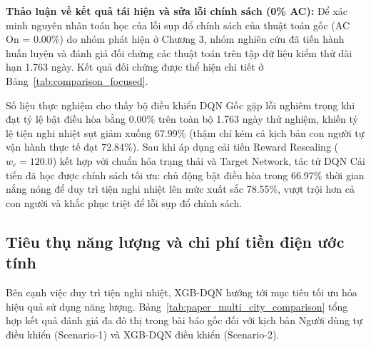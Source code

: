 \documentclass[12pt, a4paper]{report}
\begin{document}
\noindent
\textbf{Thảo luận về kết quả tái hiện và sửa lỗi chính sách (0\% AC):}
Để xác minh nguyên nhân toán học của lỗi sụp đổ chính sách của thuật toán gốc (AC On = 0.00\%) do nhóm phát hiện ở Chương 3, nhóm nghiên cứu đã tiến hành huấn luyện và đánh giá đối chứng các thuật toán trên tập dữ liệu kiểm thử dài hạn 1.763 ngày. Kết quả đối chứng được thể hiện chi tiết ở Bảng~\ref{tab:comparison_focused}.

\begin{table}[H]
    \centering
    \caption{Bảng so sánh hiệu năng các bộ điều khiển trên toàn bộ 1.763 ngày đánh giá tái hiện}
    \label{tab:comparison_focused}
    \vspace{0.2cm}
\end{table}

Số liệu thực nghiệm cho thấy bộ điều khiển DQN Gốc gặp lỗi nghiêm trọng khi đạt tỷ lệ bật điều hòa bằng 0.00\% trên toàn bộ 1.763 ngày thử nghiệm, khiến tỷ lệ tiện nghi nhiệt sụt giảm xuống 67.99\% (thậm chí kém cả kịch bản con người tự vận hành thực tế đạt 72.84\%).
Sau khi áp dụng cải tiến Reward Rescaling ($w_c = 120.0$) kết hợp với chuẩn hóa trạng thái và Target Network, tác tử DQN Cải tiến đã học được chính sách tối ưu: chủ động bật điều hòa trong 66.97\% thời gian nắng nóng để duy trì tiện nghi nhiệt lên mức xuất sắc 78.55\%, vượt trội hơn cả con người và khắc phục triệt để lỗi sụp đổ chính sách.

\subsection{Tiêu thụ năng lượng và chi phí tiền điện ước tính}
Bên cạnh việc duy trì tiện nghi nhiệt, XGB-DQN hướng tới mục tiêu tối ưu hóa hiệu quả sử dụng năng lượng. Bảng~\ref{tab:paper_multi_city_comparison} tổng hợp kết quả đánh giá đa đô thị trong bài báo gốc đối với kịch bản Người dùng tự điều khiển (Scenario-1) và XGB-DQN điều khiển (Scenario-2).
\end{document}
